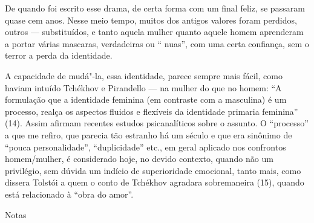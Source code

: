 De quando foi escrito esse drama, de certa forma com um final feliz, se
passaram quase cem anos. Nesse meio tempo, muitos dos antigos valores
foram perdidos, outros --- substituídos, e tanto aquela mulher quanto
aquele homem aprenderam a portar várias mascaras, verdadeiras ou ``
nuas'', com uma certa confiança, sem o terror a perda da identidade.

A capacidade de mudá"-la, essa identidade, parece sempre mais fácil, como
haviam intuído Tchékhov e Pirandello --- na mulher do que no homem: ``A
formulação que a identidade feminina (em contraste com a masculina) é um
processo, realça os aspectos fluidos e flexíveis da identidade primaria
feminina'' (14). Assim afirmam recentes estudos psicanalíticos sobre o
assunto. O ``processo'' a que me refiro, que parecia tão estranho há um
século e que era sinônimo de ``pouca personalidade'', ``duplicidade''
etc., em geral aplicado nos confrontos homem/mulher, é considerado hoje,
no devido contexto, quando não um privilégio, sem dúvida um indício de
superioridade emocional, tanto mais, como dissera Tolstói a quem o conto
de Tchékhov agradara sobremaneira (15), quando está relacionado à ``obra
do amor''.

Notas

